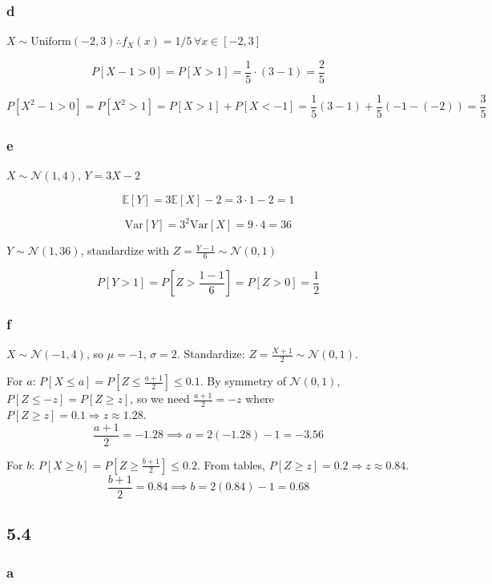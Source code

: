\documentclass{article}
\begin{document}
\subsubsection*{d}

$X \sim \text{Uniform}(-2, 3) \therefore f_X(x) = 1/5 \, \forall x \in [-2, 3]$

\[ P[X - 1 > 0] = P[X > 1] = \frac{1}{5} \cdot (3 - 1) = \frac{2}{5} \]

\[ P[X^2 - 1 > 0] = P[X^2 > 1] = P[X > 1] + P[X < -1] = \frac{1}{5}(3-1) + \frac{1}{5}(-1-(-2)) = \frac{3}{5} \]

\subsubsection*{e}

$X \sim \mathcal{N}(1, 4)$, $Y = 3X - 2$

\[ \mathbb{E}[Y] = 3\mathbb{E}[X] - 2 = 3 \cdot 1 - 2 = 1 \]

\[ \text{Var}[Y] = 3^2 \text{Var}[X] = 9 \cdot 4 = 36 \]

$Y \sim \mathcal{N}(1, 36)$, standardize with $Z = \frac{Y-1}{6} \sim \mathcal{N}(0,1)$

\[ P[Y > 1] = P\!\left[Z > \frac{1-1}{6}\right] = P[Z > 0] = \frac{1}{2} \]

\subsubsection*{f}

$X \sim \mathcal{N}(-1, 4)$, so $\mu = -1$, $\sigma = 2$. Standardize: $Z = \frac{X+1}{2} \sim \mathcal{N}(0,1)$.

For $a$: $P[X \leq a] = P\!\left[Z \leq \frac{a+1}{2}\right] \leq 0.1$.
By symmetry of $\mathcal{N}(0,1)$, $P[Z \leq -z] = P[Z \geq z]$, so we need $\frac{a+1}{2} = -z$ where $P[Z \geq z] = 0.1 \Rightarrow z \approx 1.28$.
\[ \frac{a+1}{2} = -1.28 \implies a = 2(-1.28) - 1 = -3.56 \]

For $b$: $P[X \geq b] = P\!\left[Z \geq \frac{b+1}{2}\right] \leq 0.2$.
From tables, $P[Z \geq z] = 0.2 \Rightarrow z \approx 0.84$.
\[ \frac{b+1}{2} = 0.84 \implies b = 2(0.84) - 1 = 0.68 \]

\subsection*{5.4}

\subsubsection*{a}
\end{document}
